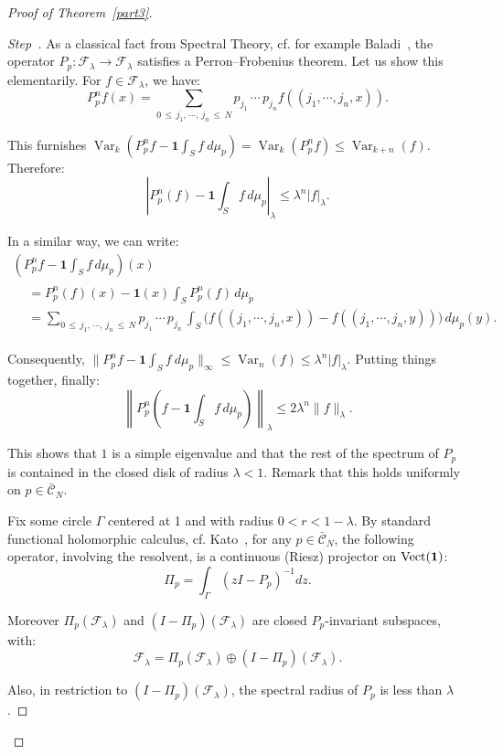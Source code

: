 \documentclass[AHL,Unicode,longabstracts,published]{cedram}
\newcommand{\Ccl}{\mathcal{C}}
\newcommand{\Fcl}{\mathcal{F}}
\newcommand{\bfun}{\mathbf{1}}
\DeclareMathOperator{\Var}{Var}
\DeclareMathOperator{\Vect}{Vect}
\newcounter{stepcount}
\newenvironment{step}{\refstepcounter{stepcount}\begin{proof}[Step~\thestepcount]}{\let\qed\relax\end{proof}}
\begin{document}
\begin{proof}[{Proof of Theorem~\ref{part3}}]
\begin{step}
As a classical fact from Spectral Theory, cf. for example Baladi~\cite{baladi}, the operator $P_p:{\Fcl}_{\lambda}\rightarrow{\Fcl}_{\lambda}$ satisfies a Perron--Frobenius theorem. Let us show this elementarily. For $f\in{\Fcl}_{\lambda}$, we have:
\[
P^n_pf(x)=\sum_{0\,\leq\,j_1,\,\cdots,\,j_n\,\leq\,N}p_{j_1}\,\cdots\,p_{j_n}f((j_1,\cdots,j_n,x)).
\]


This furnishes $\Var_k(P^n_pf-\bfun\int_Sf~d\mu_p)=\Var_k(P^n_pf)\leq\Var_{k+n}(f)$. Therefore:
\[
\left|{P^n_p(f)-\bfun\int_Sf\,d\mu_p}\right|_{\lambda}\leq \lambda^n|f|_{\lambda}.
\]



In a similar way, we can write:
\begin{multline*}
\left(P^n_pf-\bfun\int_Sf\,d\mu_p\right)(x)\\
\begin{aligned}
&=P^n_p(f)(x)-\bfun(x)\int_SP_p^n(f)\,d\mu_p\\
&=\sum_{0\,\leq\,j_1,\,\cdots,\,j_n\,\leq\,N}p_{j_1}\,\cdots\,p_{j_n}\,\int_S\big(f((j_1,\cdots,j_n,x))-f((j_1,\cdots,j_n,y))\big)\,d\mu_p(y).
\end{aligned}
\end{multline*}


Consequently, $\|P^n_pf-\bfun\int_Sf~d\mu_p\|_{\infty}\leq \Var_n(f)\leq\lambda^n|f|_{\lambda}$. Putting things together, finally:
\[
\left\|P^n_p\left(f-\bfun\int_Sf\,d\mu_p\right)\right\|_{\lambda}\leq 2\lambda^n\|f\|_{\lambda}.
\]


This shows that $1$ is a simple eigenvalue and that the rest of the spectrum of $P_p$ is contained in the closed disk of radius $\lambda<1$. Remark that this holds uniformly on $p\in\bar{\Ccl}_N$.




Fix some circle $\Gamma$ centered at 1 and with radius $0<r<1-\lambda$. By standard functional holomorphic calculus, cf. Kato~\cite{kato}, for any $p\in\bar{\Ccl}_N$, the following operator, involving the resolvent, is a continuous (Riesz) projector on $\Vect({\bf1})$:
\begin{equation}\label{proj}
\Pi_p=\int_{\Gamma}\left(zI-P_p\right)^{-1}dz.
\end{equation}

Moreover $\Pi_p({\Fcl}_{\lambda})$ and $(I-\Pi_p)({\Fcl}_{\lambda})$ are closed $P_p$-invariant subspaces, with:
\[
{\Fcl}_{\lambda}=\Pi_p({\Fcl}_{\lambda})\oplus(I-\Pi_p)({\Fcl}_{\lambda}).
\]

Also, in restriction to $(I-\Pi_p)({\Fcl}_{\lambda})$, the spectral radius of $P_p$ is less than $\lambda$.



\end{step}
\end{proof}
\end{document}
